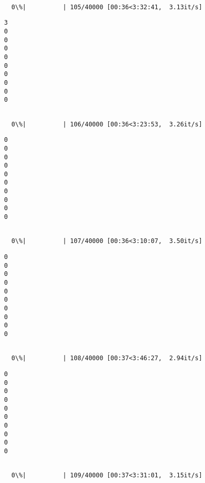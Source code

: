 \documentclass[11pt]{article}
\begin{document}
    \begin{Verbatim}[commandchars=\\\{\}]

  0\%|          | 105/40000 [00:36<3:32:41,  3.13it/s]
    \end{Verbatim}

    \begin{Verbatim}[commandchars=\\\{\}]
3
0
0
0
0
0
0
0
0
0

    \end{Verbatim}

    \begin{Verbatim}[commandchars=\\\{\}]

  0\%|          | 106/40000 [00:36<3:23:53,  3.26it/s]
    \end{Verbatim}

    \begin{Verbatim}[commandchars=\\\{\}]
0
0
0
0
0
0
0
0
0
0

    \end{Verbatim}

    \begin{Verbatim}[commandchars=\\\{\}]

  0\%|          | 107/40000 [00:36<3:10:07,  3.50it/s]
    \end{Verbatim}

    \begin{Verbatim}[commandchars=\\\{\}]
0
0
0
0
0
0
0
0
0
0

    \end{Verbatim}

    \begin{Verbatim}[commandchars=\\\{\}]

  0\%|          | 108/40000 [00:37<3:46:27,  2.94it/s]
    \end{Verbatim}

    \begin{Verbatim}[commandchars=\\\{\}]
0
0
0
0
0
0
0
0
0
0

    \end{Verbatim}

    \begin{Verbatim}[commandchars=\\\{\}]

  0\%|          | 109/40000 [00:37<3:31:01,  3.15it/s]
    \end{Verbatim}
\end{document}
